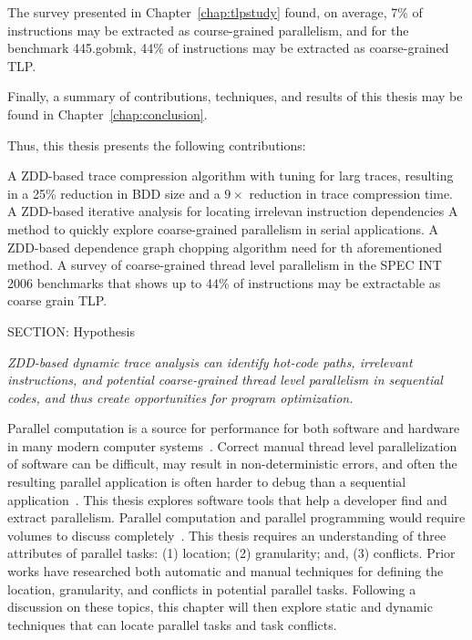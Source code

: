 {The survey presented in Chapter~\ref{chap:tlpstudy} found, on average, 7\% of instructions may be extracted as course-grained parallelism, and for the benchmark 445.gobmk, 44\% of instructions may be extracted as coarse-grained TLP.

Finally, a summary of contributions, techniques, and results of this thesis may be found in Chapter~\ref{chap:conclusion}.

Thus, this thesis presents the following contributions:

 A ZDD-based trace compression algorithm with tuning for larg
 traces, resulting in a 25\% reduction in BDD size and a $9\times$ reduction in trace compression time. A ZDD-based iterative analysis for locating irrelevan
 instruction dependencies A method to quickly explore coarse-grained parallelism in serial
 applications. A ZDD-based dependence graph chopping algorithm need for th
 aforementioned method. A survey of coarse-grained thread level parallelism in the SPEC
 INT 2006 benchmarks that shows up to 44\% of instructions may be extractable as coarse grain TLP.

SECTION: Hypothesis


\emph{ZDD-based dynamic trace analysis can identify hot-code paths, irrelevant instructions, and potential coarse-grained thread level parallelism in sequential codes, and thus create opportunities for program optimization.}


Parallel computation is a source for performance for both software and hardware in many modern computer systems~\cite{ali-reza:2007:ppopp,intel:2005:dual, intel:2005:dual2}. Correct manual thread level parallelization of software can be difficult, may result in non-deterministic errors, and often the resulting parallel application is often harder to debug than a sequential application~\cite{herlihy:2008:art,lamport:1978:tco,fridge:88:padd}. This thesis explores software tools that help a developer find and extract parallelism. Parallel computation and parallel programming would require volumes to discuss completely~\cite{lea:1996:cpij,herlihy:2008:art}.  This thesis requires an understanding of three attributes of parallel tasks: (1) location; (2) granularity; and, (3) conflicts.   Prior works have researched both automatic and manual techniques for defining the location, granularity, and conflicts in potential parallel tasks. Following a discussion on these topics, this chapter will then explore static and dynamic techniques that can locate parallel tasks and task conflicts.

}
